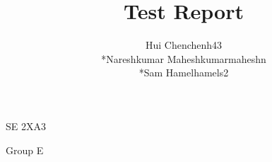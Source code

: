 \documentclass[11pt]{article}
\begin{document}
	\begin{titlepage}
	\title {Test Report}
	\maketitle
		\begin{center}
		SE 2XA3\\
		\author{
		Hui Chen\hspace{128pt}chenh43	
		\\*Nareshkumar Maheshkumar\hspace{35pt}maheshn 
		\\*Sam Hamel\hspace{118pt}hamels2 \\
		}

		Group E
		\end{center}
	\end{titlepage}
	\newpage
	
\end{document}
